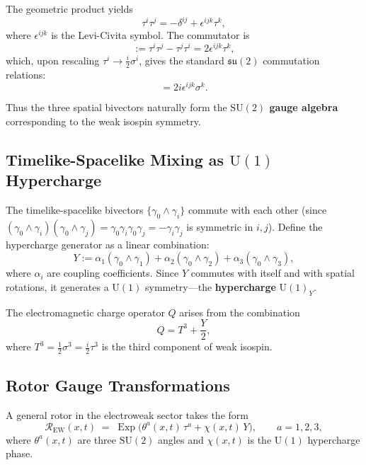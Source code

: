 \documentclass[11pt,a4paper]{article}
\newcommand{\Exp}{\operatorname{Exp}}
\newcommand{\Rotor}{\mathcal{R}}
\newcommand{\SU}{\mathrm{SU}}
\newcommand{\U}{\mathrm{U}}
\theoremstyle{definition}
\theoremstyle{plain}
\theoremstyle{remark}
\begin{document}
The geometric product yields
\begin{equation}
  \tau^i \tau^j = -\delta^{ij} + \epsilon^{ijk}\tau^k,
\end{equation}
where $\epsilon^{ijk}$ is the Levi-Civita symbol. The commutator is
\begin{equation}
  [\tau^i, \tau^j] := \tau^i \tau^j - \tau^j \tau^i = 2\epsilon^{ijk}\tau^k,
\end{equation}
which, upon rescaling $\tau^i \to \frac{i}{2}\sigma^i$, gives the standard $\mathfrak{su}(2)$ commutation relations:
\begin{equation}
  [\sigma^i, \sigma^j] = 2i\epsilon^{ijk}\sigma^k.
\end{equation}

Thus the three spatial bivectors naturally form the \textbf{$\SU(2)$ gauge algebra} corresponding to the weak isospin symmetry.

\subsection{Timelike-Spacelike Mixing as $\U(1)$ Hypercharge}

The timelike-spacelike bivectors $\{\gamma_0\wedge\gamma_i\}$ commute with each other (since $(\gamma_0\wedge\gamma_i)(\gamma_0\wedge\gamma_j) = \gamma_0\gamma_i\gamma_0\gamma_j = -\gamma_i\gamma_j$ is symmetric in $i,j$). Define the hypercharge generator as a linear combination:
\begin{equation}
  Y := \alpha_1(\gamma_0\wedge\gamma_1) + \alpha_2(\gamma_0\wedge\gamma_2) + \alpha_3(\gamma_0\wedge\gamma_3),
  \label{eq:hypercharge}
\end{equation}
where $\alpha_i$ are coupling coefficients. Since $Y$ commutes with itself and with spatial rotations, it generates a $\U(1)$ symmetry---the \textbf{hypercharge} $\U(1)_Y$.

The electromagnetic charge operator $Q$ arises from the combination
\begin{equation}
  Q = T^3 + \frac{Y}{2},
\end{equation}
where $T^3 = \frac{1}{2}\sigma^3 = \frac{i}{2}\tau^3$ is the third component of weak isospin.

\subsection{Rotor Gauge Transformations}

A general rotor in the electroweak sector takes the form
\begin{equation}
  \Rotor_{\text{EW}}(x,t) \;=\; \Exp\!\big(\theta^a(x,t)\,\tau^a + \chi(x,t)\,Y\big),
  \qquad a=1,2,3,
  \label{eq:rotor-ew}
\end{equation}
where $\theta^a(x,t)$ are three $\SU(2)$ angles and $\chi(x,t)$ is the $\U(1)$ hypercharge phase.
\end{document}
